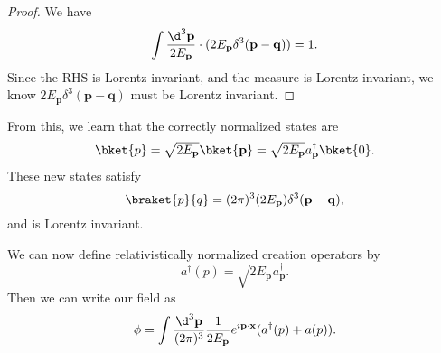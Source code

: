 \documentclass[a4paper]{article}
\begin{document}
\begin{proof}
  We have
  \[
    \int \frac{\d^3 \mathbf{p}}{2 E_\mathbf{p}} \cdot (2E_\mathbf{p} \delta^3(\mathbf{p} - \mathbf{q})) = 1.
  \]
  Since the RHS is Lorentz invariant, and the measure is Lorentz invariant, we know $2E_\mathbf{p} \delta^3(\mathbf{p} - \mathbf{q})$ must be Lorentz invariant.
\end{proof}

From this, we learn that the correctly normalized states are
\[
  \bket{p} = \sqrt{2 E_\mathbf{p}}\bket{\mathbf{p}} = \sqrt{2 E_\mathbf{p}} a_\mathbf{p}^\dagger \bket{0}.
\]
These new states satisfy
\[
  \braket{p}{q} = (2\pi)^3 (2E_\mathbf{p}) \delta^3 (\mathbf{p} - \mathbf{q}),
\]
and is Lorentz invariant.

We can now define relativistically normalized creation operators by
\[
  a^\dagger(p) = \sqrt{2E_\mathbf{p}} a_\mathbf{p}^\dagger.
\]
Then we can write our field as
\[
  \phi = \int \frac{\d^3 \mathbf{p}}{(2\pi)^3}\frac{1}{2E_\mathbf{p}} e^{i\mathbf{p}\cdot \mathbf{x}}(a^\dagger(p) + a(p)).
\]
\end{document}
